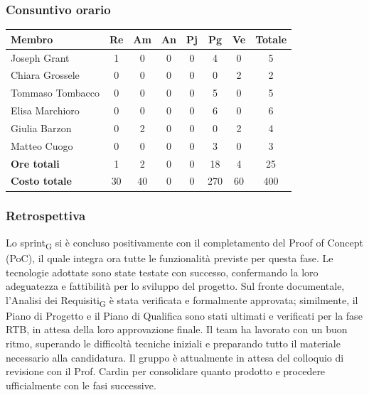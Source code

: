 \documentclass[11pt,a4paper]{article}
\newcommand{\gls}[1]{#1\textsubscript{G}}
\begin{document}
\subsubsection{Consuntivo orario}
\begin{center}
    \begin{tabular}{|l|c|c|c|c|c|c|c|}
        \hline
        \textbf{Membro} & \textbf{Re} & \textbf{Am} & \textbf{An} & \textbf{Pj} & \textbf{Pg} & \textbf{Ve} & \textbf{Totale} \\
        \hline
        Joseph Grant & 1 & 0 & 0 & 0 & 4 & 0 & 5 \\
        \hline
        Chiara Grossele & 0 & 0 & 0 & 0 & 0 & 2 & 2 \\
        \hline
        Tommaso Tombacco & 0 & 0 & 0 & 0 & 5 & 0 & 5 \\
        \hline
        Elisa Marchioro & 0 & 0 & 0 & 0 & 6 & 0 & 6 \\
        \hline
        Giulia Barzon & 0 & 2 & 0 & 0 & 0 & 2 & 4 \\
        \hline
        Matteo Cuogo & 0 & 0 & 0 & 0 & 3 & 0 & 3 \\
        \hline
        \textbf{Ore totali} & 1 & 2 & 0 & 0 & 18 & 4 & 25 \\
        \hline
        \textbf{Costo totale} & 30 & 40 & 0 & 0 & 270 & 60 & 400 \\
        \hline
    \end{tabular}
\end{center}

\subsubsection{Retrospettiva}
Lo \gls{sprint} si è concluso positivamente con il completamento del Proof of Concept (PoC), il quale integra ora tutte le funzionalità previste per questa fase. Le tecnologie adottate sono state testate con successo, confermando la loro adeguatezza e fattibilità per lo sviluppo del progetto. Sul fronte documentale, l'\gls{Analisi dei Requisiti} è stata verificata e formalmente approvata; similmente, il Piano di Progetto e il Piano di Qualifica sono stati ultimati e verificati per la fase RTB, in attesa della loro approvazione finale. Il team ha lavorato con un buon ritmo, superando le difficoltà tecniche iniziali e preparando tutto il materiale necessario alla candidatura. Il gruppo è attualmente in attesa del colloquio di revisione con il Prof. Cardin per consolidare quanto prodotto e procedere ufficialmente con le fasi successive.
\end{document}
